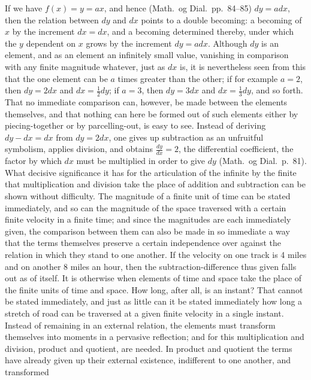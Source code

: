\documentclass[12pt,a4paper]{book}
\begin{document}
If we have $f(x) = y = ax$, and hence (Math.\ og Dial.\ pp.~84--85) $dy = adx$,
then the relation between $dy$ and $dx$ points to a double becoming: a becoming
of $x$ by the increment $dx = dx$, and a becoming determined thereby, under
which the $y$ dependent on $x$ grows by the increment $dy = adx$. Although $dy$
is an element, and as an element an infinitely small value, vanishing in
comparison with any finite magnitude whatever, just as $dx$ is, it is
nevertheless seen from this that the one element can be $a$ times greater than
the other; if for example $a = 2$, then $dy = 2dx$ and $dx = \frac{1}{2}dy$; if
$a = 3$, then $dy = 3dx$ and $dx = \frac{1}{3}dy$, and so forth. That no
immediate comparison can, however, be made between the elements themselves, and
that nothing can here be formed out of such elements either by piecing-together
or by parcelling-out, is easy to see. Instead of deriving $dy - dx = dx$ from
$dy = 2dx$, one gives up subtraction as an unfruitful symbolism, applies
division, and obtains $\frac{dy}{dx} = 2$, the differential coefficient, the
factor by which $dx$ must be multiplied in order to give $dy$ (Math.\ og Dial.\
p.~81). What decisive significance it has for the articulation of the infinite
by the finite that multiplication and division take the place of addition and
subtraction can be shown without difficulty. The magnitude of a finite unit of
time can be stated immediately, and so can the magnitude of the space traversed
with a certain finite velocity in a finite time; and since the magnitudes are
each immediately given, the comparison between them can also be made in so
immediate a way that the terms themselves preserve a certain independence over
against the relation in which they stand to one another. If the velocity on one
track is 4 miles and on another 8 miles an hour, then the subtraction-difference
thus given falls out as of itself. It is otherwise when elements of time and
space take the place of the finite units of time and space.
\setcounter{footnote}{0}
How long, after all, is an instant? That cannot be stated immediately, and just
as little can it be stated immediately how long a stretch of road can be
traversed at a given finite velocity in a single instant. Instead of remaining
in an external relation, the elements must transform themselves into moments in
a pervasive reflection; and for this multiplication and division, product and
quotient, are needed. In product and quotient the terms have already given up
their external existence, indifferent to one another, and transformed
\end{document}
